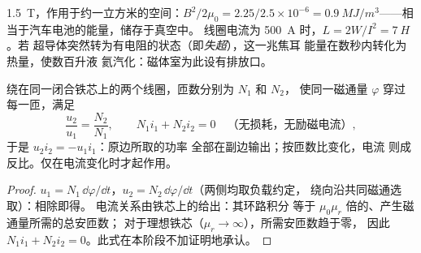\begin{example}[磁共振成像磁体]\label{ex:b1:induction:mri}
\qty{1.5}{T}，作用于约一立方米的空间：$B^2/2\mu_0 = 2.25/2.5 \times 10^{-6} =
\qty{0.9}{MJ/m^3}$——相当于汽车电池的能量，储存于真空中。
线圈电流为 \qty{500}{A} 时，$L = 2W/I^2 = \qty{7}{H}$。若
超导体突然转为有电阻的状态（即\emph{失超}），这一兆焦耳
能量在数秒内转化为热量，使数百升液
氦汽化：磁体室为此设有排放口。
\end{example}

\begin{proposition}[理想变压器]\label{prop:b1:induction:transformer}
绕在同一闭合铁芯上的两个线圈，匝数分别为 $N_1$ 和 $N_2$，
使同一磁通量 $\varphi$ 穿过每一匝，满足
\[
\frac{u_2}{u_1} = \frac{N_2}{N_1} , \qquad N_1i_1 + N_2i_2 = 0 \quad\text{（无损耗，无励磁电流）},
\]
于是 $u_2i_2 = -u_1i_1$：原边所取的功率
全部在副边输出；按匝数比变化，电流
则成反比。仅在电流变化时才起作用。
\end{proposition}

\begin{proof}
$u_1 = N_1\,\dd\varphi/\dd t$，$u_2 = N_2\,\dd\varphi/\dd t$（两侧均取负载约定，
绕向沿共同磁通选取）：相除即得。
电流关系由铁芯上的给出：其环路积分
等于 $\mu_0\mu_r$ 倍的、产生磁通量所需的总安匝数；
对于理想铁芯（$\mu_r \to \infty$），所需安匝数趋于零，
因此 $N_1i_1 + N_2i_2 = 0$。此式在本阶段不加证明地承认。
\end{proof}

